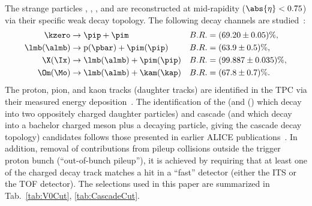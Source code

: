 \documentclass[ALICE,manyauthors]{cernphprep}
\begin{document}
The strange particles \kzero, \lmb, \almb, \Xis and \Oms are reconstructed at mid-rapidity ($\abs{\eta} < 0.75$) via their specific weak decay topology.
The following decay channels are studied~\cite{PhysRevD.98.030001}:
$$
\begin{aligned}
\kzero      & \to \pip + \pim               & B.R. & = (69.20 \pm 0.05) \%, \\
\lmb (\almb) & \to \mathrm{p}(\pbar) + \pim (\pip)    & B.R. & = (63.9  \pm 0.5)  \%, \\
\X (\Ix)    & \to \lmb (\almb) + \pim (\pip) & B.R. & = (99.887 \pm 0.035) \%, \\
\Om (\Mo)   & \to \lmb (\almb) + \kam (\kap) & B.R. & = (67.8  \pm 0.7)  \%. \\
\end{aligned}
$$
The proton, pion, and kaon tracks (daughter tracks) are identified in the TPC via their measured energy deposition~\cite{Abelev:2014ffa}.
The identification of the \Vzero (\kzero and \lmb (\almb) which decay into two oppositely charged daughter particles) and cascade (\Xis and \Oms which decay into a bachelor charged meson plus a \Vzero decaying particle, giving the cascade decay topology) candidates follows those presented in earlier ALICE publications~\cite{Aamodt:2011zza, Abelev:2012jp, Acharya:2018orn, Abelev:2013haa, Acharya:2020uxl, Acharya:2019kyh}.
In addition, removal of contributions from pileup collisions outside the trigger proton bunch (``out-of-bunch pileup''), it is achieved by requiring  that at least one of the charged decay track matches a hit in a ``fast'' detector (either the ITS or the TOF detector).
The selections used in this paper are summarized in Tab.~\ref{tab:V0Cut}, \ref{tab:CascadeCut}.
\end{document}
